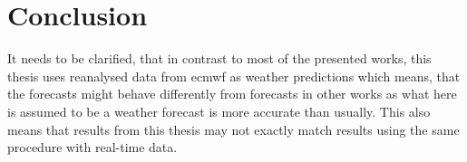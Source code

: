 \chapter{Conclusion}
\label{ch:Conclusion}

It needs to be clarified, that in contrast to most of the presented works, this thesis uses reanalysed data from \gls{ecmwf} as weather predictions which means, that the forecasts might behave differently from forecasts in other works as what here is assumed to be a weather forecast is more accurate than usually. This also means that results from this thesis may not exactly match results using the same procedure with real-time data.\\


